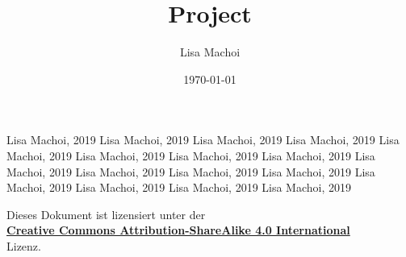 \documentclass[10pt,a4paper]{article}
\begin{document}
\thispagestyle{empty}
\title{Project}
\author{Lisa Machoi}
\date{\today}
\maketitle
\newpage
\thispagestyle{empty}
\tableofcontents
\setcounter{page}{0}
%
\newpage
\setcounter{page}{1}

















\newpage
\renewcommand{\refname}{\textsc{References:}}
\begin{thebibliography}{9}

	 Lisa Machoi, 2019
	 Lisa Machoi, 2019
	 Lisa Machoi, 2019
	 Lisa Machoi, 2019
	 Lisa Machoi, 2019
	 Lisa Machoi, 2019
	 Lisa Machoi, 2019
	 Lisa Machoi, 2019
	 Lisa Machoi, 2019
	 Lisa Machoi, 2019
	 Lisa Machoi, 2019
	 Lisa Machoi, 2019
	 Lisa Machoi, 2019
	 Lisa Machoi, 2019
	 Lisa Machoi, 2019
	 Lisa Machoi, 2019

\end{thebibliography}
\vspace{5cm}
\begin{center}
	Dieses Dokument ist lizensiert unter der\\ \href{https://creativecommons.org/licenses/by-sa/4.0/}{\textbf{Creative Commons Attribution-ShareAlike 4.0 International}}\\
	Lizenz.

	\vspace{1cm}

	{\huge\ccbysa}
\end{center}
\end{document}
